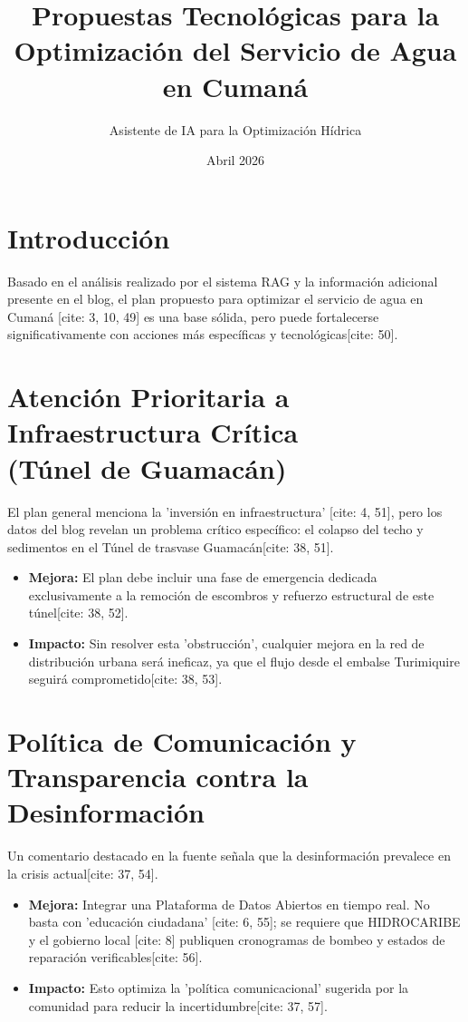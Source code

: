 \documentclass[12pt, a4paper]{article}
\title{Propuestas Tecnológicas para la Optimización del Servicio de Agua en Cumaná}
\author{Asistente de IA para la Optimización Hídrica}
\date{Abril 2026}
\begin{document}
\maketitle

\section*{Introducción}
Basado en el análisis realizado por el sistema RAG y la información adicional presente en el blog, el plan propuesto para optimizar el servicio de agua en Cumaná [cite: 3, 10, 49] es una base sólida, pero puede fortalecerse significativamente con acciones más específicas y tecnológicas[cite: 50].

\section{Atención Prioritaria a Infraestructura Crítica\\(Túnel de Guamacán)}
El plan general menciona la 'inversión en infraestructura' [cite: 4, 51], pero los datos del blog revelan un problema crítico específico: el colapso del techo y sedimentos en el Túnel de trasvase Guamacán[cite: 38, 51].

\begin{itemize}
    \item \textbf{Mejora:} El plan debe incluir una fase de emergencia dedicada exclusivamente a la remoción de escombros y refuerzo estructural de este túnel[cite: 38, 52].
    \item \textbf{Impacto:} Sin resolver esta 'obstrucción', cualquier mejora en la red de distribución urbana será ineficaz, ya que el flujo desde el embalse Turimiquire seguirá comprometido[cite: 38, 53].
\end{itemize}

\section{Política de Comunicación y Transparencia contra la Desinformación}
Un comentario destacado en la fuente señala que la desinformación prevalece en la crisis actual[cite: 37, 54].

\begin{itemize}
    \item \textbf{Mejora:} Integrar una Plataforma de Datos Abiertos en tiempo real. No basta con 'educación ciudadana' [cite: 6, 55]; se requiere que HIDROCARIBE y el gobierno local [cite: 8] publiquen cronogramas de bombeo y estados de reparación verificables[cite: 56].
    \item \textbf{Impacto:} Esto optimiza la 'política comunicacional' sugerida por la comunidad para reducir la incertidumbre[cite: 37, 57].
\end{itemize}
\end{document}
